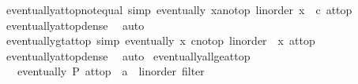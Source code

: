 \begin{isabellebody}
\endisatagproof
{\isafoldproof}%
%
\isadelimproof
\isanewline
%
\endisadelimproof
\isanewline
{}\isamarkupfalse%
\ eventually{\isacharunderscore}{\kern0pt}at{\isacharunderscore}{\kern0pt}top{\isacharunderscore}{\kern0pt}not{\isacharunderscore}{\kern0pt}equal\ {\isacharbrackleft}{\kern0pt}simp{\isacharbrackright}{\kern0pt}{\isacharcolon}{\kern0pt}\ {\isachardoublequoteopen}eventually\ {\isacharparenleft}{\kern0pt}{\isasymlambda}x{\isacharcolon}{\kern0pt}{\isacharcolon}{\kern0pt}{\isacharprime}{\kern0pt}a{\isacharcolon}{\kern0pt}{\isacharcolon}{\kern0pt}{\isacharbraceleft}{\kern0pt}no{\isacharunderscore}{\kern0pt}top{\isacharcomma}{\kern0pt}\ linorder{\isacharbraceright}{\kern0pt}{\isachardot}{\kern0pt}\ x\ {\isasymnoteq}\ c{\isacharparenright}{\kern0pt}\ at{\isacharunderscore}{\kern0pt}top{\isachardoublequoteclose}\isanewline
%
\isadelimproof
\ \ %
\endisadelimproof
%
\isatagproof
{}\isamarkupfalse%
\ eventually{\isacharunderscore}{\kern0pt}at{\isacharunderscore}{\kern0pt}top{\isacharunderscore}{\kern0pt}dense\ \isamarkupfalse%
\ auto%
\endisatagproof
{\isafoldproof}%
%
\isadelimproof
\isanewline
%
\endisadelimproof
\isanewline
{}\isamarkupfalse%
\ eventually{\isacharunderscore}{\kern0pt}gt{\isacharunderscore}{\kern0pt}at{\isacharunderscore}{\kern0pt}top\ {\isacharbrackleft}{\kern0pt}simp{\isacharbrackright}{\kern0pt}{\isacharcolon}{\kern0pt}\ {\isachardoublequoteopen}eventually\ {\isacharparenleft}{\kern0pt}{\isasymlambda}x{\isachardot}{\kern0pt}\ {\isacharparenleft}{\kern0pt}c{\isacharcolon}{\kern0pt}{\isacharcolon}{\kern0pt}{\isacharunderscore}{\kern0pt}{\isacharcolon}{\kern0pt}{\isacharcolon}{\kern0pt}{\isacharbraceleft}{\kern0pt}no{\isacharunderscore}{\kern0pt}top{\isacharcomma}{\kern0pt}\ linorder{\isacharbraceright}{\kern0pt}{\isacharparenright}{\kern0pt}\ {\isacharless}{\kern0pt}\ x{\isacharparenright}{\kern0pt}\ at{\isacharunderscore}{\kern0pt}top{\isachardoublequoteclose}\isanewline
%
\isadelimproof
\ \ %
\endisadelimproof
%
\isatagproof
{}\isamarkupfalse%
\ eventually{\isacharunderscore}{\kern0pt}at{\isacharunderscore}{\kern0pt}top{\isacharunderscore}{\kern0pt}dense\ \isamarkupfalse%
\ auto%
\endisatagproof
{\isafoldproof}%
%
\isadelimproof
\isanewline
%
\endisadelimproof
\isanewline
{}\isamarkupfalse%
\ eventually{\isacharunderscore}{\kern0pt}all{\isacharunderscore}{\kern0pt}ge{\isacharunderscore}{\kern0pt}at{\isacharunderscore}{\kern0pt}top{\isacharcolon}{\kern0pt}\isanewline
\ \ \ {\isachardoublequoteopen}eventually\ P\ {\isacharparenleft}{\kern0pt}at{\isacharunderscore}{\kern0pt}top\ {\isacharcolon}{\kern0pt}{\isacharcolon}{\kern0pt}\ {\isacharparenleft}{\kern0pt}{\isacharprime}{\kern0pt}a\ {\isacharcolon}{\kern0pt}{\isacharcolon}{\kern0pt}\ linorder{\isacharparenright}{\kern0pt}\ filter{\isacharparenright}{\kern0pt}{\isachardoublequoteclose}\isanewline

\end{isabellebody}
